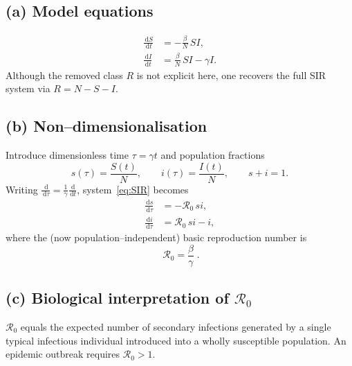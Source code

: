 \documentclass[11pt]{article}
\newcommand{\dd}{\,\mathrm{d}}
\newcommand{\RR}
{\mathcal{R}_0}
\begin{document}
\subsection*{(a) Model equations}
\begin{align}
\frac{\dd S}{\dd t} &= -\frac{\beta}{N}\,S I,\\[4pt]
\frac{\dd I}{\dd t} &= \frac{\beta}{N}\, S I-\gamma I.
\label{eq:SIR}
\end{align}
Although the removed class $R$ is not explicit here, one recovers the full SIR system via $R=N-S-I$.

\subsection*{(b) Non--dimensionalisation}
Introduce dimensionless time $\tau=\gamma t$ and population fractions
\[
s(\tau)=\frac{S(t)}{N},\qquad i(\tau)=\frac{I(t)}{N},\qquad s+i=1.
\]
Writing $\tfrac{\dd}{\dd \tau}=\tfrac1\gamma\tfrac{\dd}{\dd t}$, system~\eqref{eq:SIR} becomes
\begin{align}
\frac{\dd s}{\dd \tau} &= -\RR\, s i,\\[4pt]
\frac{\dd i}{\dd \tau} &= \RR\, s i - i,
\label{eq:nondim}
\end{align}
where the (now population--independent) basic reproduction number is
\[
\boxed{\;\RR = \frac{\beta}{\gamma}\;}.\]

\subsection*{(c) Biological interpretation of $\RR$}
$\RR$ equals the expected number of secondary infections generated by a single typical infectious individual introduced into a wholly susceptible population.  An epidemic outbreak requires $\RR>1$.
\end{document}
